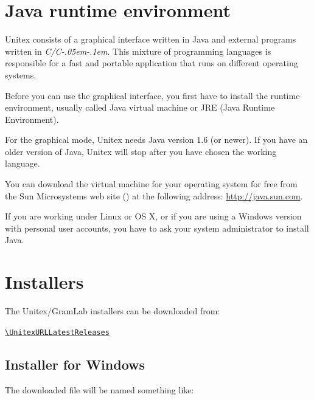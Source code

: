 \section{Java runtime environment}
Unitex consists of a graphical interface written in Java and external programs
written in \textit{C/C\kern-.05em\raisebox{.5ex}{++}\kern-.1em}. This mixture of
programming languages is responsible for a fast and portable application that
runs on different operating systems.

\bigskip
\noindent Before you can use the graphical interface, you first have to install the runtime
environment, usually called Java virtual machine  or
JRE (Java Runtime Environment).

\bigskip
\noindent For the graphical mode, Unitex needs Java version 1.6 (or newer). If you have an
older version of Java, Unitex will stop after you have chosen the working language.

\bigskip
\noindent You can download the virtual machine for your operating system for free from the
Sun Microsystems web site (\cite{site-java}) at the following address:
\url{http://java.sun.com}.

\bigskip
\noindent If you are working under Linux or OS X, or if you are using a Windows version
with personal user accounts, you have to ask your system administrator to install Java.

\section{Installers}
\begin{samepage}
The Unitex/GramLab installers can be downloaded from:

\begin{center}
{\tt\url{\UnitexURLLatestReleases}}
\end{center}
\end{samepage}

\subsection{Installer for Windows}
The downloaded file will be named something like:

\begin{flushleft}
{\tt \UnitexPackageWin{}}
{\tt \UnitexPackageWinSF{}}
\end{flushleft}

